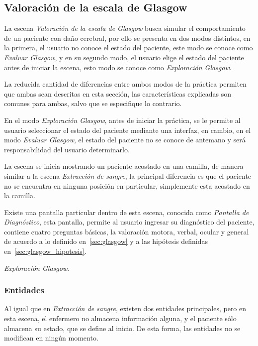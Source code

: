 \subsection{Valoración de la escala de Glasgow}


La escena  \emph{Valoración de la escala de Glasgow} busca simular el
comportamiento de un paciente con daño cerebral, por ello se presenta en dos
modos distintos, en la primera, el usuario no conoce el estado del paciente,
este modo se conoce como \emph{Evaluar Glasgow}, y en su segundo modo, el
usuario elige el estado del paciente antes de iniciar la escena, esto modo
se conoce como \emph{Exploración Glasgow}. 

La reducida cantidad de diferencias entre ambos modos de la práctica permiten
que ambas sean descritas en esta sección, las características explicadas son
comunes para ambas, salvo que se especifique lo contrario.

En el modo \emph{Exploración Glasgow}, antes de iniciar la práctica, se le
permite al usuario seleccionar el estado del paciente mediante una interfaz, en
cambio, en el modo \emph{Evaluar Glasgow}, el estado del paciente no se conoce
de antemano y será responsabilidad del usuario determinarlo.

La escena se inicia mostrando un paciente acostado en una camilla, de manera
similar a la escena \emph{Extracción de sangre}, la principal diferencia es que
el paciente no se encuentra en ninguna posición en particular, simplemente esta
acostado en la camilla.

Existe una pantalla particular dentro de esta escena, conocida como
\emph{Pantalla de Diagnóstico}, esta pantalla, permite al usuario ingresar su
diagnóstico del paciente, contiene cuatro preguntas básicas, la valoración
motora, verbal, ocular y general de acuerdo a lo definido en~\ref{sec:glasgow} y
a las hipótesis definidas en~\ref{sec:glasgow_hipotesis}.

\emph{Exploración Glasgow}.

\subsubsection{Entidades}

Al igual que en \emph{Extracción de sangre}, existen dos entidades principales,
pero en esta escena, el enfermero no almacena información alguna, y el
paciente sólo almacena su estado, que se define al inicio. De esta forma, las
entidades no se modifican en ningún momento.

